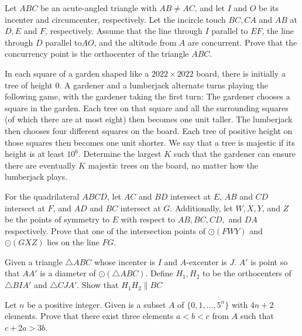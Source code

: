 \documentclass[11pt]{scrartcl}
\begin{document}
\begin{problem}[318208660266829737]
Let $ABC$ be an acute-angled triangle with $AB \ne AC$, and let $I$ and $O$ be its incenter and circumcenter, respectively. Let the incircle touch $BC, CA$ and $AB$ at $D, E$ and $F$, respectively. Assume that the line through $I$ parallel to $EF$, the line through $D$ parallel to$ AO$, and the altitude from $A$ are concurrent. Prove that the concurrency point is the orthocenter of the triangle $ABC$.
\end{problem}
\begin{problem}[8799177804774743019]
In each square of a garden shaped like a $2022 \times 2022$ board, there is initially a tree of height $0$. A gardener and a lumberjack alternate turns playing the following game, with the gardener taking the first turn:
The gardener chooses a square in the garden. Each tree on that square and all the surrounding squares (of which there are at most eight) then becomes one unit taller.
The lumberjack then chooses four different squares on the board. Each tree of positive height on those squares then becomes one unit shorter.
We say that a tree is majestic if its height is at least $10^6$. Determine the largest $K$ such that the gardener can ensure there are eventually $K$ majestic trees on the board, no matter how the lumberjack plays.
\end{problem}
\begin{problem}[436681276656848]
For the quadrilateral $ABCD$, let $AC$ and $BD$ intersect at $E$, $AB$ and $CD$ intersect at $F$, and $AD$ and $BC$ intersect at $G$. Additionally, let $W, X, Y$, and $Z$ be the points of symmetry to $E$ with respect to $AB, BC, CD,$ and $DA$ respectively. Prove that one of the intersection points of $\odot(FWY)$ and $\odot(GXZ)$ lies on the line $FG$.
\end{problem}
\begin{problem}[528504335909385]
Given a triangle $ \triangle{ABC} $ whose incenter is $ I $ and $ A $-excenter is $ J $. $ A' $ is point so that $ AA' $ is a diameter of $ \odot\left(\triangle{ABC}\right) $. Define $ H_{1}, H_{2} $ to be the orthocenters of $ \triangle{BIA'} $ and $ \triangle{CJA'} $. Show that $ H_{1}H_{2} \parallel BC $
\end{problem}
\begin{problem}[80567267310692]
Let $n$ be a positive integer. Given is a subset $A$ of $\{0,1,...,5^n\}$ with $4n+2$ elements. Prove that there exist three elements $a<b<c$ from $A$ such that $c+2a>3b$.
\end{problem}
\end{document}

